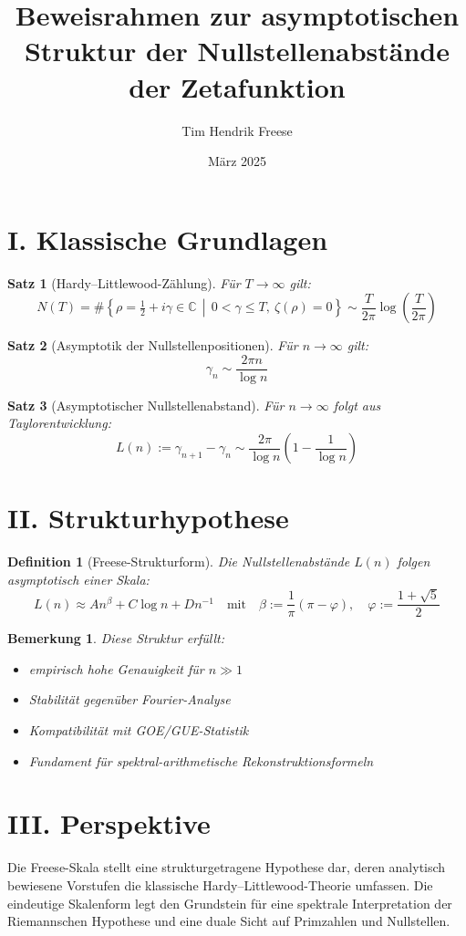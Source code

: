 \documentclass[12pt]{article}
\title{Beweisrahmen zur asymptotischen Struktur der Nullstellenabstände der Zetafunktion}
\author{Tim Hendrik Freese}
\date{März 2025}
\newtheorem{theorem}{Satz}
\newtheorem{definition}{Definition}
\newtheorem{remark}{Bemerkung}
\begin{document}
\maketitle

\section*{I. Klassische Grundlagen}

\begin{theorem}[Hardy–Littlewood-Zählung]
Für \( T \to \infty \) gilt:
\[
N(T) = \#\left\{ \rho = \tfrac{1}{2} + i\gamma \in \mathbb{C} \,\middle|\, 0 < \gamma \le T,\ \zeta(\rho) = 0 \right\}
\sim \frac{T}{2\pi} \log\left( \frac{T}{2\pi} \right)
\]
\end{theorem}

\begin{theorem}[Asymptotik der Nullstellenpositionen]
Für \( n \to \infty \) gilt:
\[
\gamma_n \sim \frac{2\pi n}{\log n}
\]
\end{theorem}

\begin{theorem}[Asymptotischer Nullstellenabstand]
Für \( n \to \infty \) folgt aus Taylorentwicklung:
\[
L(n) := \gamma_{n+1} - \gamma_n
\sim \frac{2\pi}{\log n} \left( 1 - \frac{1}{\log n} \right)
\]
\end{theorem}

\section*{II. Strukturhypothese}

\begin{definition}[Freese-Strukturform]
Die Nullstellenabstände \( L(n) \) folgen asymptotisch einer Skala:
\[
L(n) \approx A n^\beta + C \log n + D n^{-1}
\quad \text{mit} \quad \beta := \frac{1}{\pi} (\pi - \varphi),
\quad \varphi := \frac{1 + \sqrt{5}}{2}
\]
\end{definition}

\begin{remark}
Diese Struktur erfüllt:
\begin{itemize}
    \item empirisch hohe Genauigkeit für \( n \gg 1 \)
    \item Stabilität gegenüber Fourier-Analyse
    \item Kompatibilität mit GOE/GUE-Statistik
    \item Fundament für spektral-arithmetische Rekonstruktionsformeln
\end{itemize}
\end{remark}

\section*{III. Perspektive}

Die Freese-Skala stellt eine strukturgetragene Hypothese dar, deren analytisch bewiesene Vorstufen die klassische Hardy–Littlewood-Theorie umfassen. Die eindeutige Skalenform legt den Grundstein für eine spektrale Interpretation der Riemannschen Hypothese und eine duale Sicht auf Primzahlen und Nullstellen.
\end{document}

